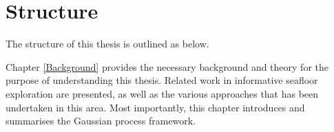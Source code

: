 %	
%		
%		
%			
%			
%			
%		
%			
			
	\newpage
	\section{Structure}
	
		The structure of this thesis is outlined as below.
		
		
		Chapter \ref{Background} provides the necessary background and theory for the purpose of understanding this thesis. Related work in informative seafloor exploration are presented, as well as the various approaches that has been undertaken in this area. Most importantly, this chapter introduces and summarises the Gaussian process framework.
		
